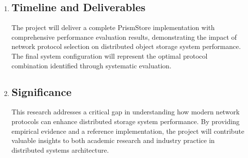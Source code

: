 \documentclass[12pt]{article}
\begin{document}
\begin{enumerate}
    \item \subsection*{Timeline and Deliverables}
        The project will deliver a complete PrismStore implementation with comprehensive performance evaluation results, demonstrating the impact of network protocol
        selection on distributed object storage system performance.
        The final system configuration will represent the optimal protocol combination identified through systematic evaluation.
    \item \subsection*{Significance}
        This research addresses a critical gap in understanding how modern network protocols can enhance distributed storage system performance.
        By providing empirical evidence and a reference implementation,
        the project will contribute valuable insights to both academic research and industry practice in distributed systems architecture.
\end{enumerate}

% 
% 
\end{document}

